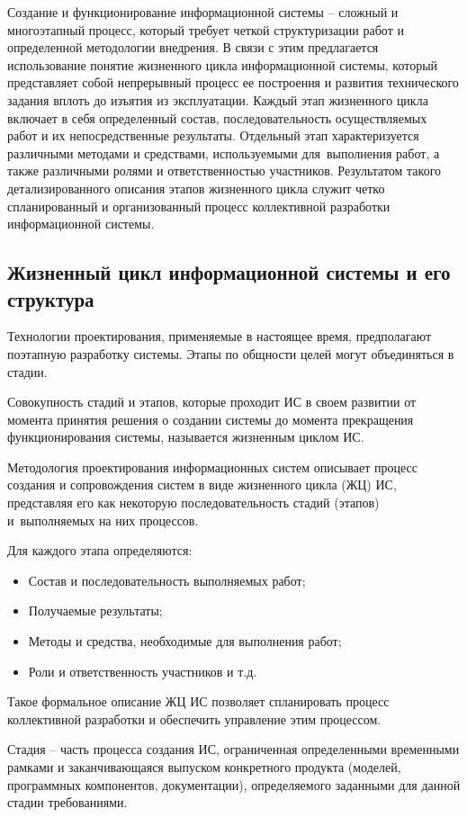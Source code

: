 \documentclass{ou}
\begin{document}
Создание и функционирование информационной системы -- сложный и многоэтапный процесс, который требует четкой структуризации работ и определенной методологии внедрения. В связи с этим предлагается использование понятие жизненного цикла информационной системы, который представляет собой непрерывный процесс ее построения и развития технического задания вплоть до изъятия из эксплуатации. Каждый этап жизненного цикла включает в себя определенный состав, последовательность осуществляемых работ и их непосредственные результаты. Отдельный этап характеризуется различными методами и средствами, используемыми для~выполнения работ, а также различными ролями и ответственностью участников. Результатом такого детализированного описания этапов жизненного цикла служит четко спланированный и организованный процесс коллективной разработки информационной системы\cite{cyberleninka_lifecycle}.
\subsection{Жизненный цикл информационной системы и его структура}
Технологии проектирования, применяемые в настоящее время, предполагают поэтапную разработку системы. Этапы по общности целей могут объединяться в стадии.

Совокупность стадий и этапов, которые проходит ИС в своем развитии от момента принятия решения о создании системы до момента прекращения функционирования системы, называется жизненным циклом ИС.

Методология проектирования информационных систем описывает процесс создания и сопровождения систем в виде жизненного цикла (ЖЦ) ИС, представляя его как некоторую последовательность стадий (этапов) и~выполняемых на них процессов.

Для каждого этапа определяются:
\begin{itemize}[label=-, leftmargin=0em, itemindent=3.35em, nosep]
\item Состав и последовательность выполняемых работ;
\item Получаемые результаты;
\item Методы и средства, необходимые для выполнения работ;
\item Роли и ответственность участников и т.д.
\end{itemize}

Такое формальное описание ЖЦ ИС позволяет спланировать процесс коллективной разработки и обеспечить управление этим процессом.

Стадия -- часть процесса создания ИС, ограниченная определенными временными рамками и заканчивающаяся выпуском конкретного продукта (моделей, программных компонентов, документации), определяемого заданными для данной стадии требованиями.
\end{document}
